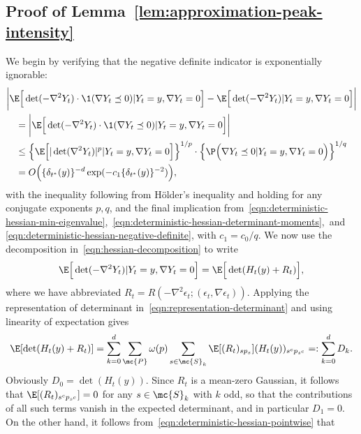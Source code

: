 \documentclass{article}
\begin{document}
	\subsection{Proof of Lemma~\ref{lem:approximation-peak-intensity}}
	\label{subsec:pf-approximation-peak-intensity}
	We begin by verifying that the negative definite indicator is exponentially ignorable:
	\begin{equation}
		\label{pf:approximation-peak-intensity-1}
		\begin{aligned}
			& \bigg|\E\Big[\det(-\nabla^2 Y_t) \cdot \1(\nabla Y_t \preceq 0)|Y_t = y,\nabla Y_t = 0\Big] - \E\Big[\det(-\nabla^2 Y_t)|Y_t = y,\nabla Y_t = 0\Big]\bigg| \\
			& \quad = \bigg|\E\Big[\det(-\nabla^2 Y_t) \cdot \1(\nabla Y_t \preceq 0)|Y_t = y,\nabla Y_t = 0\Big]\bigg| \\
			& \quad \leq \Big\{\E\Big[|\det(\nabla^2 Y_t)|^{p}|Y_t = y,\nabla Y_t = 0\Big]\Big\}^{1/p} \cdot \Big\{\P\Big(\nabla Y_t \preceq 0|Y_t = y,\nabla Y_t = 0\Big)\Big\}^{1/q} \\
			& \quad = O\Big(\{\delta_{t^*}(y)\}^{-d} \exp(-c_1 \{\delta_{t^*}(y)\}^{-2})\Big),
		\end{aligned}
	\end{equation}
	with the inequality following from H\"{o}lder's inequality and holding for any conjugate exponents $p,q$, and the final implication from~\eqref{eqn:deterministic-hessian-min-eigenvalue},~\eqref{eqn:deterministic-hessian-determinant-moments},~and \eqref{eqn:deterministic-hessian-negative-definite}, with $c_1 = c_0/q$. We now use the decomposition in~\eqref{eqn:hessian-decomposition} to write
	\begin{equation*}
		\E\Big[\det(-\nabla^2 Y_t)|Y_t = y,\nabla Y_t = 0\Big] = \E\Big[\det(H_t(y) + R_t)\Big],
	\end{equation*}
	where we have abbreviated $R_t = R(-\nabla^2 \epsilon_t;(\epsilon_t,\nabla \epsilon_t))$. Applying the representation of determinant in~\eqref{eqn:representation-determinant} and using linearity of expectation gives
	\begin{align*}
		\E[\det(H_t(y) + R_t)] = \sum_{k = 0}^{d} \sum_{\mc{P}} \omega(p) \sum_{s \in \mc{S}_k} \E[(R_t)_{sp_{s}}] (H_t(y))_{s^cp_{s^c}} =: \sum_{k = 0}^{d} D_k.
	\end{align*}
	Obviously $D_0 = \det(H_t(y))$. Since $R_t$ is a mean-zero Gaussian, it follows that $\E[(R_t)_{s^cp_{s^c}}] = 0$ for any $s \in \mc{S}_k$ with $k$ odd, so that the contributions of all such terms vanish in the expected determinant, and in particular $D_1 = 0$. On the other hand, it follows from~\eqref{eqn:deterministic-hessian-pointwise} that
\end{document}
